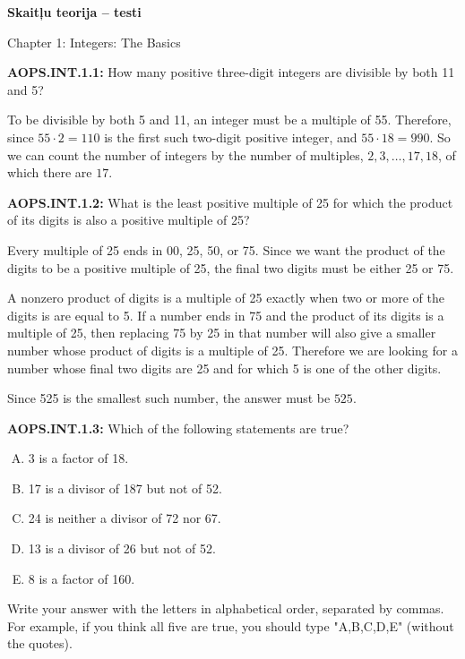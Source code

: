 \documentclass[11pt]{article}
\newenvironment{uzdevums}[1][\unskip]{%
\vspace{3mm}
\noindent
\textbf{#1:}
\noindent}
{}
\begin{document}
\begin{center}
{\LARGE \bf Skaitļu teorija -- testi}
\end{center}

\begin{center}
{\large Chapter 1: Integers: The Basics}
\end{center}


\begin{uzdevums}[AOPS.INT.1.1]
How many positive three-digit integers are divisible by both 11 and 5?
\end{uzdevums}

To be divisible by both 5 and 11, an integer must be a multiple of 55. Therefore, since $55 \cdot 2 = 110$ is the first such two-digit positive integer, and $55 \cdot 18 = 990$. So we can count the number of integers by the number of multiples, $2, 3, \ldots , 17 , 18$, of which there are $\boxed{17}$.

\begin{uzdevums}[AOPS.INT.1.2]
What is the least positive multiple of 25 for which the product of its digits is also a positive multiple of 25?
\end{uzdevums}

Every multiple of 25 ends in 00, 25, 50, or 75. Since we want the product of the digits to be a positive multiple of 25, the final two digits must be either 25 or 75.

A nonzero product of digits is a multiple of 25 exactly when two or more of the digits is are equal to 5. If a number ends in 75 and the product of its digits is a multiple of 25, then replacing 75 by 25 in that number will also give a smaller number whose product of digits is a multiple of 25. Therefore we are looking for a number whose final two digits are 25 and for which 5 is one of the other digits.

Since 525 is the smallest such number, the answer must be $\boxed{525}$.

\begin{uzdevums}[AOPS.INT.1.3]
Which of the following statements are true?
\begin{enumerate}[A.]
\item 3 is a factor of 18.
\item 17 is a divisor of 187 but not of 52.
\item 24 is neither a divisor of 72 nor 67.
\item 13 is a divisor of 26 but not of 52.
\item 8 is a factor of 160.
\end{enumerate}
Write your answer with the letters in alphabetical order, separated by commas. For example, if you think all five are true, you should type "A,B,C,D,E" (without the quotes).
\end{uzdevums}
\end{document}
